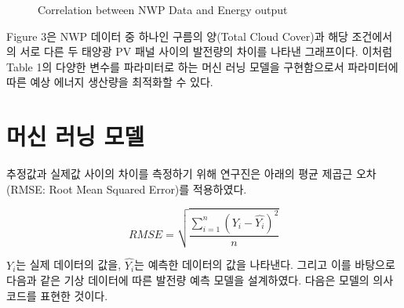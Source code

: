 \documentclass{article}
\begin{document}
\begin{figure}[!h]
\centering
{}
\caption{Correlation between NWP Data and Energy output}
\label{fig_3}
\end{figure}

Figure 3은 NWP 데이터 중 하나인 구름의 양(Total Cloud Cover)과 해당 조건에서의 서로 다른 두 태양광 PV 패널 사이의 발전량의 차이를 나타낸 그래프이다. 이처럼 Table 1의 다양한 변수를 파라미터로 하는 머신 러닝 모델을 구현함으로서 파라미터에 따른 예상 에너지 생산량을 최적화할 수 있다.

\section{머신 러닝 모델}
추정값과 실제값 사이의 차이를 측정하기 위해 연구진은 아래의 평균 제곱근 오차(RMSE: Root Mean Squared Error)를 적용하였다.

\begin{equation}
RMSE=\sqrt{\frac{\sum_{i=1}^{n}(Y_i-\hat{Y_i})^2}{n}}
\end{equation}

$Y_i$는 실제 데이터의 값을, $\hat{Y_i}$는 예측한 데이터의 값을 나타낸다.
그리고 이를 바탕으로 다음과 같은 기상 데이터에 따른 발전량 예측 모델을 설계하였다. 다음은 모델의 의사코드를 표현한 것이다.
\end{document}
